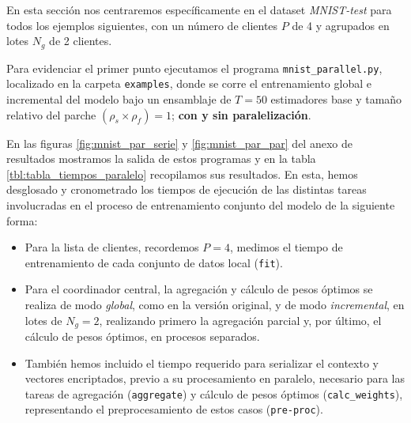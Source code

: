 \documentclass[00-Trabajo_Final.tex]{subfiles}
\begin{document}
\vspace{0.5em}

En esta sección nos centraremos específicamente en el dataset \textit{MNIST-test} para todos los ejemplos siguientes, con un número de clientes $P$ de 4 y agrupados en lotes $N_g$ de 2 clientes.

\vspace{0.5em}

Para evidenciar el primer punto ejecutamos el programa \verb|mnist_parallel.py|, localizado en la carpeta \verb|examples|, donde se corre el entrenamiento global e incremental del modelo bajo un ensamblaje de $T = 50$ estimadores base y tamaño relativo del parche $(\rho_s \times \rho_f) = 1$; \textbf{con y sin paralelización}.

\vspace{0.5em}

En las figuras \ref{fig:mnist_par_serie} y \ref{fig:mnist_par_par} del anexo de resultados mostramos la salida de estos programas y en la tabla \ref{tbl:tabla_tiempos_paralelo} recopilamos sus resultados. En esta, hemos desglosado y cronometrado los tiempos de ejecución de las distintas tareas involucradas en el proceso de entrenamiento conjunto del modelo de la siguiente forma:

\begin{itemize}[noitemsep, topsep=2pt]
    \item Para la lista de clientes, recordemos $P = 4$, medimos el tiempo de entrenamiento de cada conjunto de datos local (\texttt{fit}).
    \item Para el coordinador central, la agregación y cálculo de pesos óptimos se realiza de modo \textit{global}, como en la versión original, y de modo \textit{incremental}, en lotes de $N_g = 2$, realizando primero la agregación parcial y, por último, el cálculo de pesos óptimos, en procesos separados.
    \item También hemos incluido el tiempo requerido para serializar el contexto y vectores encriptados, previo a su procesamiento en paralelo, necesario para las tareas de agregación (\texttt{aggregate}) y cálculo de pesos óptimos (\texttt{calc\_weights}), representando el preprocesamiento de estos casos (\texttt{pre-proc}).
\end{itemize}
\end{document}
